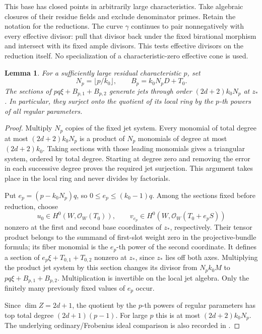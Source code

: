\documentclass[12pt,a4paper,psamsfonts]{amsart}
\theoremstyle{definition}
\theoremstyle{plain}
\newtheorem{lemma}{Lemma}[section]
\newcommand{\OO}{\mathcal O}
\begin{document}
This base has closed points in arbitrarily large characteristics.
Take algebraic closures of their residue fields and exclude
denominator primes. Retain the notation for the reductions.
The curve $\gamma$ continues to pair nonnegatively with every
effective divisor: pull that divisor back under the fixed
birational morphism and intersect with its fixed ample divisors.
This tests effective divisors on the reduction itself. No
specialization of a characteristic-zero effective cone is used.

\begin{lemma}\label{fr:positive-characteristic-jets}
For a sufficiently large residual characteristic $p$, set
\[
 N_p=\lfloor p/k_0\rfloor,\qquad B_p=k_0N_pD+T_0.
\]
The sections of $pq\xi+B_{p,1}+B_{p,2}$ generate jets through order
$(2d+2)k_0N_p$ at $z_*$.  In particular, they surject onto the quotient
of its local ring by the $p$-th powers of all regular parameters.
\end{lemma}

\begin{proof}
Multiply $N_p$ copies of the fixed jet system.  Every monomial of
total degree at most $(2d+2)k_0N_p$ is a product of $N_p$ monomials
of degree at most $(2d+2)k_0$.  Taking sections with those leading
monomials gives a triangular system, ordered by total degree.
Starting at degree zero and removing the error in each successive
degree proves the required jet surjection. This argument takes
place in the local ring and never divides by factorials.

Put $e_p=(p-k_0N_p)q$, so $0\le e_p\le(k_0-1)q$.
Among the sections fixed before reduction, choose
\[
 u_0\in H^0(W,\OO_W(T_0)),\qquad
 v_{e_p}\in H^0(W,\OO_W(T_0+e_pS))
\]
nonzero at the first and second base coordinates of $z_*$,
respectively. Their tensor product belongs to the summand of
first-slot weight zero in the projective-bundle formula; its
fiber monomial is the $e_p$-th power of the second coordinate.
It defines a section of
$e_p\xi+T_{0,1}+T_{0,2}$ nonzero at $z_*$, since $z_*$ lies
off both axes. Multiplying the product jet system by this section
changes its divisor from $N_pk_0M$ to
$pq\xi+B_{p,1}+B_{p,2}$. Multiplication is invertible on the
local jet algebra. Only the finitely many previously fixed
values of $e_p$ occur.

Since $\dim Z=2d+1$, the
quotient by the $p$-th powers of regular parameters has top total
degree $(2d+1)(p-1)$.  For large $p$ this is at most
$(2d+2)k_0N_p$. The underlying ordinary/Frobenius ideal comparison is
also recorded in \cite[proof of Proposition~2.12, Equation~(2.8)]{MustataSchwede}.
\end{proof}
\end{document}
